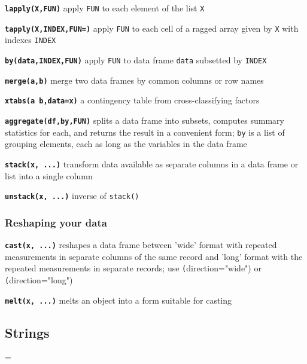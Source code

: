 \documentclass[8pt,landscape]{article}
\newcommand{\code}{\texttt}
\newcommand{\bcode}[1]{\texttt{\textbf{#1}}}
\begin{document}
\begin{multicols*}{3}
\bcode{lapply(X,FUN)} apply \code{FUN} to each element of the list \code{X}

\bcode{tapply(X,INDEX,FUN=)} apply \code{FUN} to each cell
of a ragged array given by \code{X} with indexes \code{INDEX}

\bcode{by(data,INDEX,FUN)} apply \code{FUN} to data frame \code{data}
subsetted by \code{INDEX}

\bcode{merge(a,b)} merge two data frames by common columns or row names

\bcode{xtabs(a~b,data=x)} a contingency table from cross-classifying factors

\bcode{aggregate(df,by,FUN)} splits a data frame into subsets, computes summary statistics for
     each, and returns the result in a convenient form; \code{by} is a
     list of grouping elements, each as long as the variables in the data frame

\bcode{stack(x, ...)} transform data available as
     separate columns in a data frame or list into a single column

\bcode{unstack(x, ...)} inverse of \code{stack()}

\bigskip

\subsubsection{Reshaping your data}

\bcode{cast(x, ...)} reshapes a data frame between 'wide' format with
     repeated measurements in separate columns of the same record and
     'long' format with the repeated measurements in separate records;
     use \code(direction="wide") or \code(direction="long")

\bcode{melt(x, ...)} melts an object into a form suitable for casting

% 
% 
%  
% 

\bigskip
     
\subsection{Strings}
\everypar={\hangindent=9mm}


\end{multicols*}
\end{document}

